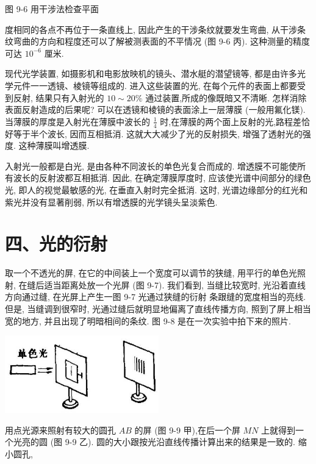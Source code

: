 \documentclass[10pt]{article}
\begin{document}
图 9-6 用干涉法检查平面

度相同的各点不再位于一条直线上, 因此产生的干涉条纹就要发生弯曲, 从干涉条纹弯曲的方向和程度还可以了解被测表面的不平情况 (图 9-6 丙). 这种测量的精度可达 \({10}^{-6}\) 厘米.

现代光学装置, 如摄影机和电影放映机的镜头、潜水艇的潜望镜等, 都是由许多光学元件一一透镜、棱镜等组成的. 进入这些装置的光, 在每个元件的表面上都要受到反射, 结果只有入射光的 \({10} \sim {20}\%\) 通过装置,所成的像既暗又不清晰. 怎样消除表面反射造成的后果呢? 可以在透镜和棱镜的表面涂上一层薄膜 (一般用氟化镁). 当薄膜的厚度是入射光在薄膜中波长的 \(\frac{1}{4}\) 时,在薄膜的两个面上反射的光,路程差恰好等于半个波长, 因而互相抵消. 这就大大减少了光的反射损失, 增强了透射光的强度. 这种薄膜叫增透膜.

入射光一般都是白光, 是由各种不同波长的单色光复合而成的. 增透膜不可能使所有波长的反射波都互相抵消. 因此, 在确定薄膜厚度时, 应该使光谱中间部分的绿色光, 即人的视觉最敏感的光, 在垂直入射时完全抵消. 这时, 光谱边缘部分的红光和紫光并没有显著削弱, 所以有增透膜的光学镜头呈淡紫色.

\section*{四、光的衍射}

取一个不透光的屏, 在它的中间装上一个宽度可以调节的狭缝, 用平行的单色光照射, 在缝后适当距离处放一个光屏 (图 9-7). 我们看到, 当缝比较宽时, 光沿着直线方向通过缝, 在光屏上产生一图 9-7 光通过狭缝的衍射 条跟缝的宽度相当的亮线. 但是, 当缝调到很窄时, 光通过缝后就明显地偏离了直线传播方向, 照到了屏上相当宽的地方, 并且出现了明暗相间的条纹. 图 9-8 是在一次实验中拍下来的照片.

\begin{center}
\includegraphics[max width=0.5\textwidth]{images/01913056-1f15-74d8-9184-9aab52c9d66b_306_137340.jpg}
\end{center}

用点光源来照射有较大的圆孔 \({AB}\) 的屏 (图 9-9 甲),在后一个屏 \({MN}\) 上就得到一个光亮的圆 (图 9-9 乙). 圆的大小跟按光沿直线传播计算出来的结果是一致的. 缩小圆孔,
\end{document}
